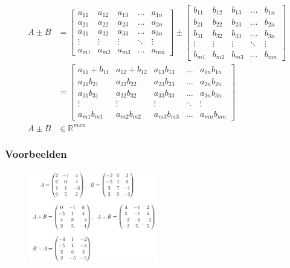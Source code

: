 \documentclass{article}
\begin{document}
\begin{align*}
    A \pm B & = 
\begin{bmatrix}
    a_{11} & a_{12} & a_{13} & \dots & a_{1n}\\
    a_{21} & a_{22} & a_{23} & \dots & a_{2n}\\
    a_{31} & a_{32} & a_{33} & \dots & a_{3n}\\
    \vdots & \vdots & \vdots & \ddots & \vdots\\
    a_{m1} & a_{m2} & a_{m3} & \dots & a_{mn}
\end{bmatrix} \pm 
\begin{bmatrix}
    b_{11} & b_{12} & b_{13} & \dots & b_{1n}\\
    b_{21} & b_{22} & b_{23} & \dots & b_{2n}\\
    b_{31} & b_{32} & b_{33} & \dots & b_{3n}\\
    \vdots & \vdots & \vdots & \ddots & \vdots\\
    b_{m1} & b_{m2} & b_{m3} & \dots & b_{mn}
\end{bmatrix} \\
& = \begin{bmatrix}
    a_{11}+b_{11} & a_{12}+b_{12} & a_{13}b_{13} & \dots & a_{1n}b_{1n}\\
    a_{21}b_{21} & a_{22}b_{22} & a_{23}b_{23} & \dots & a_{2n}b_{2n}\\
    a_{31}b_{31} & a_{32}b_{32} & a_{33}b_{33} & \dots & a_{3n}b_{3n}\\
    \vdots & \vdots & \vdots & \ddots & \vdots\\
    a_{m1}b_{m1} & a_{m2}b_{m2} & a_{m3}b_{m3} & \dots & a_{mn}b_{mn}
\end{bmatrix}\\
A \pm B & \in \mathbb{R}^{mxn}
\end{align*}

\subsubsection{Voorbeelden}

\begin{figure}[H]
    \centering
    \includegraphics[width=0.5\textwidth]{matrix-somverschil-voorbeelden.png}
\end{figure}
\end{document}
